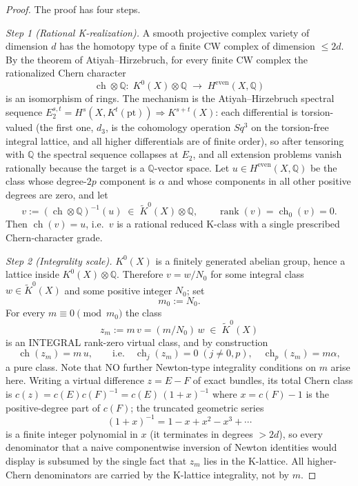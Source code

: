 \documentclass[11pt]{article}
\newcommand{\ch}{\operatorname{ch}}
\begin{document}
\begin{proof}
The proof has four steps.

\smallskip
\emph{Step 1 (Rational K-realization).}
A smooth projective complex variety of dimension $d$ has the homotopy
type of a finite CW complex of dimension $\le 2d$.
By the theorem of Atiyah--Hirzebruch, for every finite CW complex the
rationalized Chern character
\[
  \ch\otimes\mathbb Q:\;K^0(X)\otimes\mathbb Q
  \;\longrightarrow\;
  H^{\mathrm{even}}(X,\mathbb Q)
\]
is an isomorphism of rings. The mechanism is the Atiyah--Hirzebruch
spectral sequence
$E_2^{s,t}=H^s(X,K^t(\mathrm{pt}))\Rightarrow K^{s+t}(X)$:
each differential is torsion-valued (the first one, $d_3$, is the
cohomology operation $Sq^3$ on the torsion-free integral lattice, and
all higher differentials are of finite order), so after tensoring with
$\mathbb Q$ the spectral sequence collapses at $E_2$, and all
extension problems vanish rationally because the target is a
$\mathbb Q$-vector space.
Let $u\in H^{\mathrm{even}}(X,\mathbb Q)$ be the class whose degree-$2p$
component is $\alpha$ and whose components in all other positive degrees
are zero, and let
\[
  v:=(\ch\otimes\mathbb Q)^{-1}(u)\;\in\;\widetilde K^0(X)\otimes\mathbb Q,
  \qquad \operatorname{rank}(v)=\ch_0(v)=0 .
\]
Then $\ch(v)=u$, i.e.\ $v$ is a rational reduced K-class with a single
prescribed Chern-character grade.

\smallskip
\emph{Step 2 (Integrality scale).}
$K^0(X)$ is a finitely generated abelian group, hence a lattice inside
$K^0(X)\otimes\mathbb Q$. Therefore $v=w/N_0$ for some integral class
$w\in\widetilde K^0(X)$ and some positive integer $N_0$; set
\[
  m_0:=N_0 .
\]
For every $m\equiv 0 \pmod {m_0}$ the class
\[
  z_m:=m\,v=(m/N_0)\,w\;\in\;\widetilde K^0(X)
\]
is an INTEGRAL rank-zero virtual class, and by construction
\[
  \ch(z_m)=m\,u,\qquad\text{i.e.}\quad
  \ch_j(z_m)=0\;(j\neq 0,p),\quad \ch_p(z_m)=m\alpha ,
\]
a pure class.
Note that NO further Newton-type integrality conditions on $m$ arise
here. Writing a virtual difference $z=E-F$ of exact bundles, its
total Chern class is
$c(z)=c(E)c(F)^{-1}=c(E)\,(1+x)^{-1}$ where $x=c(F)-1$ is the
positive-degree part of $c(F)$; the truncated geometric series
\[
  (1+x)^{-1}=1-x+x^2-x^3+\cdots
\]
is a finite integer polynomial in $x$ (it terminates in degrees $>2d$),
so every denominator that a naive componentwise inversion of Newton
identities would display is subsumed by the single fact that
$z_m$ lies in the K-lattice. All higher-Chern denominators are carried
by the K-lattice integrality, not by $m$.


\end{proof}
\end{document}
